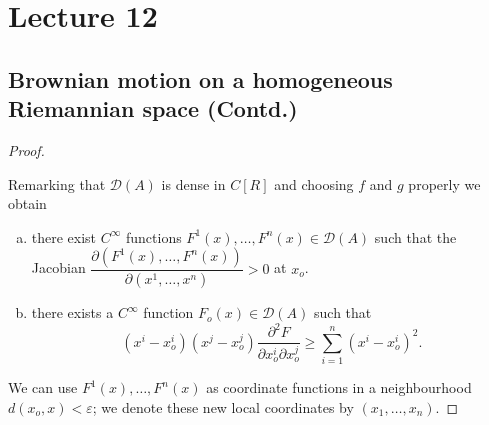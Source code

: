 \chapter{Lecture 12}%

\section[Brownian motion on a homogeneous...]{Brownian motion on a homogeneous Riemannian space (Contd.)}\label{chap12:sec1}
\begin{proof}
 \pageoriginale
 \begin{Step}
  Remarking that $\mathscr{D} (A)$ is dense in $C[R]$ and choosing $f$
  and $g$ properly we obtain 
  \begin{enumerate}[(a)]
  \item there exist $C^\infty$ functions $F^1 (x), \ldots, F^n (x)
   \in \mathscr{D} (A)$ such that the Jacobian $\dfrac{\partial (F^1
    (x), \ldots, F^n (x))}{\partial (x^1, \ldots, x^n)} > 0$ at
   $x_o$. 
  \item there exists a $C^\infty$ function $F_o (x) \in \mathscr{D}
   (A)$ such that 
  $$
  (x^i - x^i_o ) (x^j - x^j_o) \frac{\partial^2 F}{\partial x^i_o
  \partial x^j_o} \ge \sum^n_{i = 1} (x^i - x^i_o)^2. 
  $$
 \end{enumerate}
 \end{Step}

 We can use $F^1 (x), \ldots, F^n (x)$ as coordinate functions in a
 neighbourhood $d(x_o, x) < \varepsilon $; we denote these new local
 coordinates by $(x_1, \ldots, x_n)$. 
 

\end{proof}
